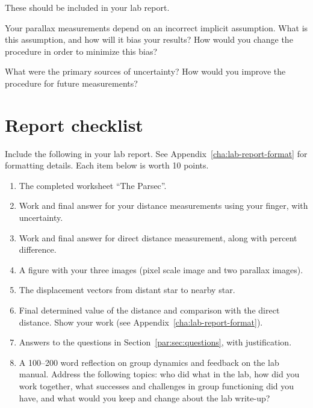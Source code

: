 These should be included in your lab report.

\begin{steps}
	\item Your parallax measurements depend on an incorrect implicit assumption. What is
	this assumption, and how will it bias your results? How would you change the
	procedure in order to minimize this bias?
	\item What were the primary sources
	of uncertainty? How would you improve the procedure for future measurements?
\end{steps}

\section{Report checklist}

Include the following in your lab report. See Appendix~\ref{cha:lab-report-format} for formatting details. Each item below is worth 10 points.

\begin{enumerate}
	\item The completed worksheet ``The Parsec''.
	\item Work and final answer for your distance measurements using your finger, with uncertainty.
	\item Work and final answer for direct distance measurement, along with percent difference.
	\item A figure with your three images (pixel scale image and two parallax images).
	\item The displacement vectors from distant star to nearby star.
	\item Final determined value of the distance and comparison with the direct distance. Show your work (see Appendix~\ref{cha:lab-report-format}).
	\item Answers to the questions in Section~\ref{par:sec:questions}, with justification.
	\item A 100--200 word reflection on group dynamics and feedback on the lab manual. Address the following topics: who did what in the lab, how did you work together, what successes and challenges in group functioning did you have, and what would you keep and change about the lab write-up?
\end{enumerate}